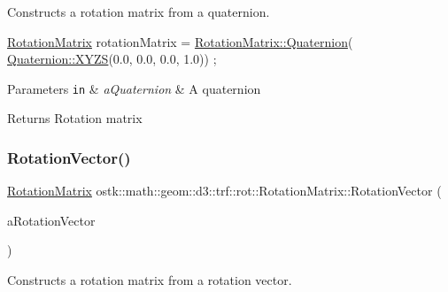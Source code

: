 Constructs a rotation matrix from a quaternion. 


\begin{DoxyCode}
\hyperlink{classostk_1_1math_1_1geom_1_1d3_1_1trf_1_1rot_1_1_rotation_matrix_a5e6bed0779ad7db0c5bf26b2bd96f8ba}{RotationMatrix} rotationMatrix = \hyperlink{classostk_1_1math_1_1geom_1_1d3_1_1trf_1_1rot_1_1_rotation_matrix_ac327eae5f7a354639d05b6bdffdae640}{RotationMatrix::Quaternion}(
      \hyperlink{classostk_1_1math_1_1geom_1_1d3_1_1trf_1_1rot_1_1_quaternion_ac57ea57a4033622ed1389101b2e58c76}{Quaternion::XYZS}(0.0, 0.0, 0.0, 1.0)) ;
\end{DoxyCode}



\begin{DoxyParams}[1]{Parameters}
\mbox{\tt in}  & {\em a\+Quaternion} & A quaternion \\
\hline
\end{DoxyParams}
\begin{DoxyReturn}{Returns}
Rotation matrix 
\end{DoxyReturn}
\mbox{\label{classostk_1_1math_1_1geom_1_1d3_1_1trf_1_1rot_1_1_rotation_matrix_a609da1b600078c74a84bcac864aa877b}} 
\subsubsection{\texorpdfstring{Rotation\+Vector()}{RotationVector()}}
{\footnotesize\ttfamily \hyperlink{classostk_1_1math_1_1geom_1_1d3_1_1trf_1_1rot_1_1_rotation_matrix}{Rotation\+Matrix} ostk\+::math\+::geom\+::d3\+::trf\+::rot\+::\+Rotation\+Matrix\+::\+Rotation\+Vector (\begin{DoxyParamCaption}\item[{const \hyperlink{classostk_1_1math_1_1geom_1_1d3_1_1trf_1_1rot_1_1_rotation_vector}{rot\+::\+Rotation\+Vector} \&}]{a\+Rotation\+Vector }\end{DoxyParamCaption})\hspace{0.3cm}{\ttfamily [static]}}



Constructs a rotation matrix from a rotation vector. 


